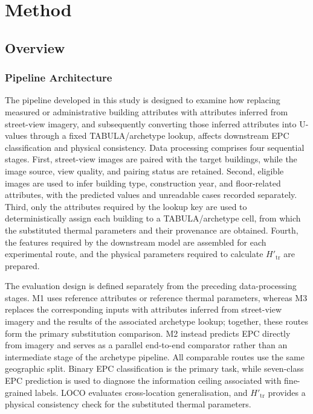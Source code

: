 \chapter{Method}
\label{ch:3}
\label{sec:3}


\section{Overview}
\label{sec:3_1}


\subsection{Pipeline Architecture}
\label{sec:3_1_1}


The pipeline developed in this study is designed to examine how replacing measured or administrative building attributes with attributes inferred from street-view imagery, and subsequently converting those inferred attributes into U-values through a fixed TABULA/archetype lookup, affects downstream EPC classification and physical consistency. Data processing comprises four sequential stages. First, street-view images are paired with the target buildings, while the image source, view quality, and pairing status are retained. Second, eligible images are used to infer building type, construction year, and floor-related attributes, with the predicted values and unreadable cases recorded separately. Third, only the attributes required by the lookup key are used to deterministically assign each building to a TABULA/archetype cell, from which the substituted thermal parameters and their provenance are obtained. Fourth, the features required by the downstream model are assembled for each experimental route, and the physical parameters required to calculate \(H'_{\mathrm{tr}}\) are prepared.


The evaluation design is defined separately from the preceding data-processing stages. M1 uses reference attributes or reference thermal parameters, whereas M3 replaces the corresponding inputs with attributes inferred from street-view imagery and the results of the associated archetype lookup; together, these routes form the primary substitution comparison. M2 instead predicts EPC directly from imagery and serves as a parallel end-to-end comparator rather than an intermediate stage of the archetype pipeline. All comparable routes use the same geographic split. Binary EPC classification is the primary task, while seven-class EPC prediction is used to diagnose the information ceiling associated with fine-grained labels. LOCO evaluates cross-location generalisation, and \(H'_{\mathrm{tr}}\) provides a physical consistency check for the substituted thermal parameters.


